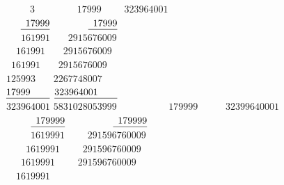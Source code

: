 \hspace{20mm}%
$\phantom{00\ f\ 0}\phantom{0000}3$%
\pend%
\newpage
\pstart%
\noindent%
\centering%
$\phantom{0000}\phantom{0000}17999$%
\hspace{35mm}%
$\phantom{0000}323964001$%
\\
$\phantom{0000}\phantom{000}\underline{\phantom{0}17999\vphantom{j}}$%
\hspace{35mm}%
$\phantom{0000}\phantom{000}\underline{\phantom{0}17999\vphantom{j}}$%
\\
$\phantom{0000}\phantom{000}161991$%
\hspace{35mm}%
$\phantom{000}2915676009$%
\\
$\phantom{0000}\phantom{00}161991\phantom{0}$%
\hspace{35mm}%
$\phantom{00}2915676009\phantom{0}$%
\\
$\phantom{0000}\phantom{0}161991\phantom{00}$%
\hspace{35mm}%
$\phantom{0}2915676009\phantom{00}$%
\\
$\phantom{0000}125993\phantom{000}$%
\hspace{35mm}%
$2267748007\phantom{000}$%
\\
$\phantom{0000}\underline{17999\phantom{0000}\vphantom{j}}$%
\hspace{35mm}%
$\underline{323964001\phantom{0000}\vphantom{j}}$%
\\
$\phantom{0000}323964001$%
\hspace{35mm}%
$5831028053999$%
\pend%
\vspace{3.00em}%
\pstart%
\noindent%
\centering%
$\phantom{00000}\phantom{00000}179999$%
\hspace{35mm}%
$\phantom{00000}32399640001$%
\\
$\phantom{00000}\phantom{0000}\underline{\phantom{0}179999\vphantom{j}}$%
\hspace{35mm}%
$\phantom{00000}\phantom{0000}\underline{\phantom{0}179999\vphantom{j}}$%
\\
$\phantom{00000}\phantom{0000}1619991$%
\hspace{35mm}%
$\phantom{0000}291596760009$%
\\
$\phantom{00000}\phantom{000}1619991\phantom{0}$%
\hspace{35mm}%
$\phantom{000}291596760009\phantom{0}$%
\\
$\phantom{00000}\phantom{00}1619991\phantom{00}$%
\hspace{35mm}%
$\phantom{00}291596760009\phantom{00}$%
\\
$\phantom{00000}\phantom{0}1619991\phantom{000}$%
